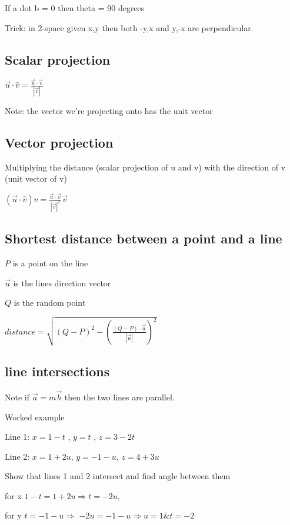 \documentclass{extarticle}
\begin{document}
\begin{multicols}{4}
If a dot b = 0 then theta = 90 degrees

Trick: in 2-space given x,y then both -y,x and y,-x are perpendicular.

\subsection{Scalar projection}

$\vec{u}\cdot\hat{v}=\frac{\vec{u}\cdot\vec{v}}{\left|\vec{v}\right|}$

Note: the vector we're projecting onto has the unit vector


\subsection{Vector projection}

Multiplying the distance (scalar projection of u and v) with the direction of v (unit vector of v)

$\left(\vec{u}\cdot\hat{v}\right)\hat{v}=\frac{\vec{u}\cdot\vec{v}}{\left|\vec{v}\right|^2}\vec{v}$

\subsection{Shortest distance between a point and a line}

$P$ is a point on the line

$\vec{u}$ is the lines direction vector

$Q$ is the random point

$distance=\sqrt{(Q-P)^2-  (\frac{(Q-P)\cdot\vec{u}}{\left|\vec{u}\right|})^2}$


\subsection{line intersections}
Note if $\vec{a} = m\vec{b}$ then the two lines are parallel.


Worked example

Line 1: $x=1-t$ , $y=t$ , $z=3-2t$

Line 2: $x=1+2u$, $y=-1-u$, $z=4+3u$

Show that lines 1 and 2 intersect and find angle between them

for x $1-t =1+2u \Rightarrow t =-2u$,

for y $t =-1-u \Rightarrow$ $ -2u=-1-u \Rightarrow u=1 \& t =-2$


\end{multicols}
\end{document}
